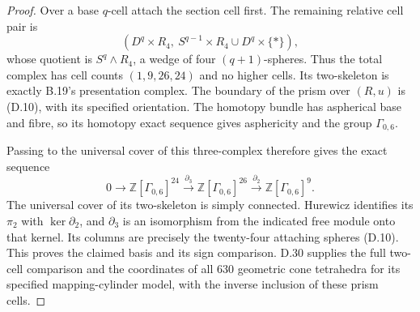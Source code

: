 \begin{proof}
Over a base $q$-cell attach the section cell first.
The remaining relative cell pair is
\[
 (D^q\times R_4,\ S^{q-1}\times R_4\cup D^q\times\{*\}),
\]
whose quotient is $S^q\wedge R_4$, a wedge of four
$(q+1)$-spheres.  Thus the total complex has cell counts
$(1,9,26,24)$ and no higher cells.  Its two-skeleton
is exactly B.19's presentation complex.  The boundary
of the prism over $(R,u)$ is (D.10), with its specified
orientation.  The homotopy bundle has aspherical base
and fibre, so its homotopy exact sequence gives
asphericity and the group $\Gamma_{0,6}$.

Passing to the universal cover of this three-complex
therefore gives the exact sequence
\[
 0\longrightarrow\mathbb Z[\Gamma_{0,6}]^{24}
  \xrightarrow{\partial_3}\mathbb Z[\Gamma_{0,6}]^{26}
  \xrightarrow{\partial_2}\mathbb Z[\Gamma_{0,6}]^9.
\]
The universal cover of its two-skeleton is simply
connected.  Hurewicz identifies its $\pi_2$ with
$\ker\partial_2$, and $\partial_3$ is an isomorphism
from the indicated free module onto that kernel.
Its columns are precisely the twenty-four attaching
spheres (D.10).  This proves the claimed basis and
its sign comparison.  D.30 supplies the full two-cell
comparison and the coordinates of all $630$ geometric
cone tetrahedra for its specified mapping-cylinder
model, with the inverse inclusion of these prism cells.
\end{proof}
